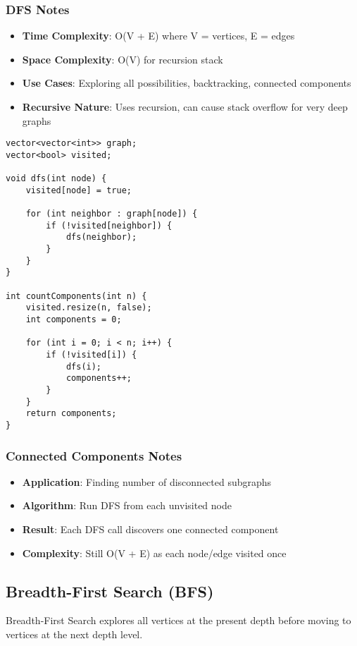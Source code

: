 \documentclass[11pt,a4paper]{article}
\begin{document}
\subsubsection{DFS Notes}
\begin{itemize}
\item \textbf{Time Complexity}: O(V + E) where V = vertices, E = edges
\item \textbf{Space Complexity}: O(V) for recursion stack
\item \textbf{Use Cases}: Exploring all possibilities, backtracking, connected components
\item \textbf{Recursive Nature}: Uses recursion, can cause stack overflow for very deep graphs
\end{itemize}

\newpage
\begin{lstlisting}[caption={DFS with Connected Components}]
vector<vector<int>> graph;
vector<bool> visited;

void dfs(int node) {
    visited[node] = true;
    
    for (int neighbor : graph[node]) {
        if (!visited[neighbor]) {
            dfs(neighbor);
        }
    }
}

int countComponents(int n) {
    visited.resize(n, false);
    int components = 0;
    
    for (int i = 0; i < n; i++) {
        if (!visited[i]) {
            dfs(i);
            components++;
        }
    }
    return components;
}
\end{lstlisting}

\subsubsection{Connected Components Notes}
\begin{itemize}
\item \textbf{Application}: Finding number of disconnected subgraphs
\item \textbf{Algorithm}: Run DFS from each unvisited node
\item \textbf{Result}: Each DFS call discovers one connected component
\item \textbf{Complexity}: Still O(V + E) as each node/edge visited once
\end{itemize}

\newpage
\subsection{Breadth-First Search (BFS)}
Breadth-First Search explores all vertices at the present depth before moving to vertices at the next depth level.
\end{document}
